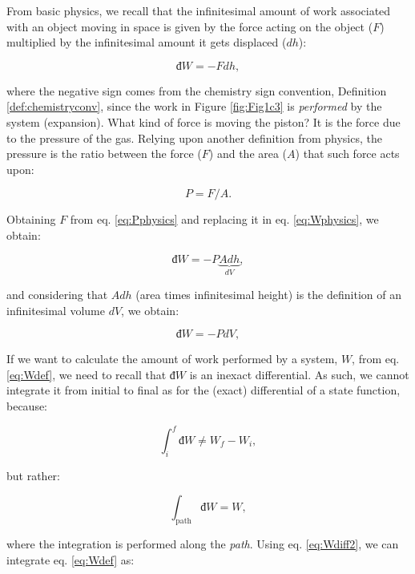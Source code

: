 \documentclass[
]{book}
\theoremstyle{definition}
\theoremstyle{definition}
\theoremstyle{definition}
\theoremstyle{remark}
\begin{document}
From basic physics, we recall that the infinitesimal amount of work associated with an object moving in space is given by the force acting on the object (\(F\)) multiplied by the infinitesimal amount it gets displaced (\(d h\)):

\begin{equation}
  đ W = - Fdh,
  \label{eq:Wphysics}
\end{equation}

where the negative sign comes from the chemistry sign convention, Definition \ref{def:chemistryconv}, since the work in Figure \ref{fig:Fig1c3} is \emph{performed} by the system (expansion). What kind of force is moving the piston? It is the force due to the pressure of the gas. Relying upon another definition from physics, the pressure is the ratio between the force (\(F\)) and the area (\(A\)) that such force acts upon:

\begin{equation}
  P = F/A.
  \label{eq:Pphysics}
\end{equation}

Obtaining \(F\) from eq. \eqref{eq:Pphysics} and replacing it in eq. \eqref{eq:Wphysics}, we obtain:

\begin{equation}
  đ W = - P \underbrace{Adh}_{dV},
  \label{eq:Wphysics2}
\end{equation}

and considering that \(Adh\) (area times infinitesimal height) is the definition of an infinitesimal volume \(dV\), we obtain:

\begin{equation}
  đ W = - PdV,
  \label{eq:Wdef}
\end{equation}

If we want to calculate the amount of work performed by a system, \(W\), from eq. \eqref{eq:Wdef}, we need to recall that \(đ W\) is an inexact differential. As such, we cannot integrate it from initial to final as for the (exact) differential of a state function, because:

\begin{equation}
  \int_{i}^{f}đ W \neq W_f - W_i,
  \label{eq:Wdiff}
\end{equation}

but rather:

\begin{equation}
  \int_{\text{path}} đ W = W,
  \label{eq:Wdiff2}
\end{equation}

where the integration is performed along the \emph{path}. Using eq. \eqref{eq:Wdiff2}, we can integrate eq. \eqref{eq:Wdef} as:
\end{document}
